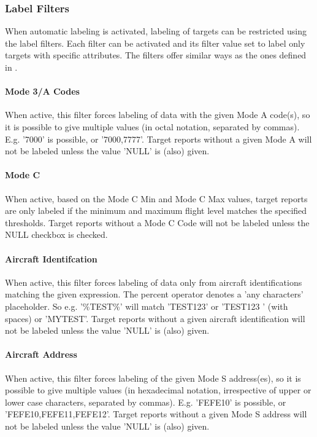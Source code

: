 \subsubsection{Label Filters}

When automatic labeling is activated, labeling of targets can be restricted using the label filters. Each filter can be activated and its filter value set to label only targets with specific attributes. The filters offer similar ways as the ones defined in .

\paragraph{Mode 3/A Codes}

When active, this filter forces labeling of data with the given Mode A code(s), so it is possible to give multiple values (in octal notation, separated by commas). E.g. '7000' is possible, or '7000,7777'. Target reports without a given Mode A will not be labeled unless the value 'NULL' is (also) given. \\

\paragraph{Mode C}

When active, based on the Mode C Min and Mode C Max values, target reports are only labeled if the minimum and maximum flight level matches the specified thresholds. Target reports without a Mode C Code will not be labeled unless the NULL checkbox is checked.

\paragraph{Aircraft Identifcation}

When active, this filter forces labeling of data only from aircraft identifications matching the given expression. The percent operator denotes a 'any characters' placeholder. So e.g. '\%TEST\%' will match 'TEST123' or 'TEST123   ' (with spaces) or 'MYTEST'. Target reports without a given aircraft identification will not be labeled unless the value 'NULL' is (also) given.


\paragraph{Aircraft Address}

When active, this filter forces labeling of the given Mode S address(es), so it is possible to give multiple values (in hexadecimal notation, irrespective of upper or lower case characters, separated by commas). E.g. 'FEFE10' is possible, or 'FEFE10,FEFE11,FEFE12'. Target reports without a given Mode S address will not be labeled unless the value 'NULL' is (also) given.



